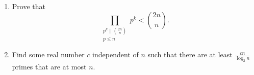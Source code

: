 \documentclass{article}
\begin{document}
\begin{enumerate}
\begin{enumerate}
\begin{itemize}
        \end{itemize}
      \item Prove that 
        \[\prod_{\substack{p^k\|\binom{2n}n\\ p\le n}}p^k<\binom{2n}n.\]
      \item Find some real number $c$ independent of $n$ such that there are at
        least $\frac{cn}{\log_2 n}$ primes that are at most $n$.
    \end{enumerate} 
        
      
\end{enumerate}
\end{document}
